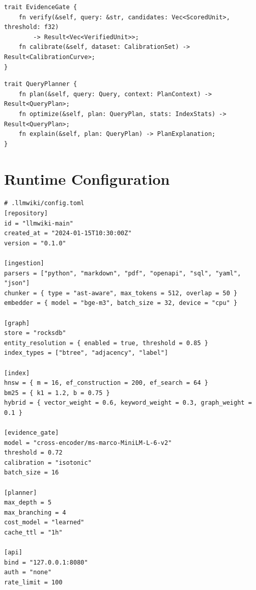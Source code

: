 \begin{interface}[EvidenceGate]
\label{iface:evidence-gate}
\begin{verbatim}
trait EvidenceGate {
    fn verify(&self, query: &str, candidates: Vec<ScoredUnit>, threshold: f32) 
        -> Result<Vec<VerifiedUnit>>;
    fn calibrate(&self, dataset: CalibrationSet) -> Result<CalibrationCurve>;
}
\end{verbatim}
\end{interface}

\begin{interface}[QueryPlanner]
\label{iface:query-planner}
\begin{verbatim}
trait QueryPlanner {
    fn plan(&self, query: Query, context: PlanContext) -> Result<QueryPlan>;
    fn optimize(&self, plan: QueryPlan, stats: IndexStats) -> Result<QueryPlan>;
    fn explain(&self, plan: QueryPlan) -> PlanExplanation;
}
\end{verbatim}
\end{interface}

\section{Runtime Configuration}
\label{sec:architecture:config}

\begin{verbatim}
# .llmwiki/config.toml
[repository]
id = "llmwiki-main"
created_at = "2024-01-15T10:30:00Z"
version = "0.1.0"

[ingestion]
parsers = ["python", "markdown", "pdf", "openapi", "sql", "yaml", "json"]
chunker = { type = "ast-aware", max_tokens = 512, overlap = 50 }
embedder = { model = "bge-m3", batch_size = 32, device = "cpu" }

[graph]
store = "rocksdb"
entity_resolution = { enabled = true, threshold = 0.85 }
index_types = ["btree", "adjacency", "label"]

[index]
hnsw = { m = 16, ef_construction = 200, ef_search = 64 }
bm25 = { k1 = 1.2, b = 0.75 }
hybrid = { vector_weight = 0.6, keyword_weight = 0.3, graph_weight = 0.1 }

[evidence_gate]
model = "cross-encoder/ms-marco-MiniLM-L-6-v2"
threshold = 0.72
calibration = "isotonic"
batch_size = 16

[planner]
max_depth = 5
max_branching = 4
cost_model = "learned"
cache_ttl = "1h"

[api]
bind = "127.0.0.1:8080"
auth = "none"
rate_limit = 100
\end{verbatim}

